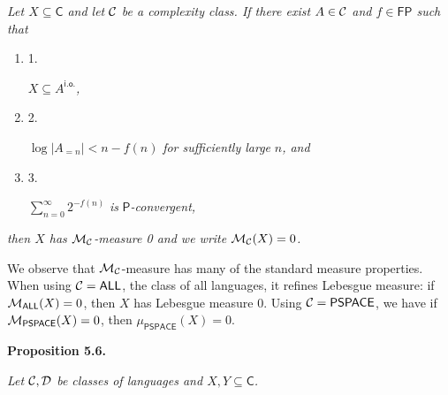 \emph{Let $X\subseteq\mathsf{C}$ and let ${\cal C}$ be a complexity class.
If there exist $A\in{\cal C}$ and $f\in\mathsf{FP}$ such that}\par


\begin{enumerate}


\item[] 
1. 


$X\subseteq A^{\mathsf{i.o.}}$\emph{,}\par





\item[] 
2. 


$\log|A_{=n}|<n-f(n)$\emph{ for sufficiently large }$n$\emph{, and}\par





\item[] 
3. 


$\sum\limits_{n=0}^{\infty}2^{-f(n)}$\emph{ is }$\mathsf{P}$\emph{-convergent,}\par





\end{enumerate}


\emph{then $X$ has ${{\cal M}_{{\cal C}}}$-measure 0 and we write ${{\cal M}_{{\cal C}}}(X)=0$.}\par






We observe that ${{\cal M}_{{\cal C}}}$-measure has many of the standard measure properties. When using ${\cal C}=\mathsf{ALL}$, the class of all languages, it refines Lebesgue measure: if ${{\cal M}_{\mathsf{ALL}}}(X)=0$, then $X$ has Lebesgue measure 0. Using ${\cal C}=\mathsf{PSPACE}$, we have if ${{\cal M}_{\mathsf{PSPACE}}}(X)=0$, then $\mu_{\mathsf{PSPACE}}(X)=0$.\par





\par\medskip\noindent\textbf{
\textbf{Proposition 5.6}\textbf{.}
}\par



\emph{Let ${\cal C},{\cal D}$ be classes of languages and
$X,Y\subseteq\mathsf{C}$.}\par


